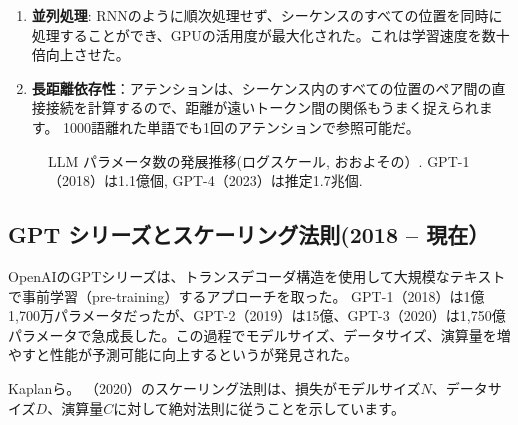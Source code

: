\begin{enumerate}
\item\textbf{並列処理}: RNNのように順次処理せず、シーケンスのすべての位置を同時に処理することができ、GPUの活用度が最大化された。これは学習速度を数十倍向上させた。
\item\textbf{長距離依存性}：アテンションは、シーケンス内のすべての位置のペア間の直接接続を計算するので、距離が遠いトークン間の関係もうまく捉えられます。 1000語離れた単語でも1回のアテンションで参照可能だ。
\end{enumerate}

\begin{figure}[htbp]
\centering
{}
\caption{LLM パラメータ数の発展推移(ログスケール, おおよその）. GPT-1（2018）は1.1億個, GPT-4（2023）は推定1.7兆個.}
\label{fig:llm-scaling}
\end{figure}

\subsection{GPT シリーズとスケーリング法則(2018  --  現在）}

OpenAIのGPTシリーズは、トランスデコーダ構造を使用して大規模なテキストで事前学習（pre-training）するアプローチを取った。 GPT-1（2018）は1億1,700万パラメータだったが、GPT-2（2019）は15億、GPT-3（2020）は1,750億パラメータで急成長した。この過程でモデルサイズ、データサイズ、演算量を増やすと性能が予測可能に向上するというが発見された。

Kaplanら。 （2020）のスケーリング法則は、損失がモデルサイズ$N$、データサイズ$D$、演算量$C$に対して絶対法則に従うことを示しています。

